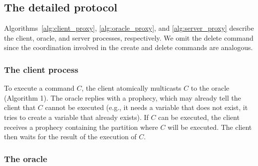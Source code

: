 \subsection{The detailed protocol}
\label{sec:dynastar-detailed}

Algorithms~\ref{alg:client_proxy}, \ref{alg:oracle_proxy}, and
\ref{alg:server_proxy} describe the client, oracle, and server processes,
respectively. We omit the delete command since the coordination involved in the
create and delete commands are analogous.


\subsubsection{The client process}

To execute a command $C$, the client atomically multicasts $C$ to the oracle
(Algorithm 1). The oracle replies with a prophecy, which may already tell the
client that $C$ cannot be executed (e.g., it needs a variable that does not
exist, it tries to create a variable that already exists). If $C$ can be
executed, the client receives a prophecy containing the partition where $C$ will
be executed. The client then waits for the result of the execution of $C$.




\subsubsection{The oracle}

